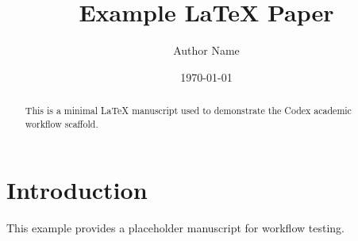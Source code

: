\documentclass{article}
\title{Example LaTeX Paper}
\author{Author Name}
\date{\today}
\begin{document}
\maketitle

\begin{abstract}
This is a minimal LaTeX manuscript used to demonstrate the Codex academic workflow scaffold.
\end{abstract}

\section{Introduction}
This example provides a placeholder manuscript for workflow testing.
\end{document}
